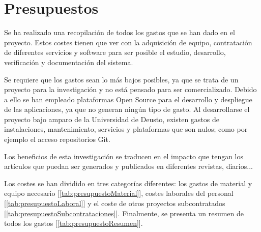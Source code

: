 \chapter{Presupuestos}
Se ha realizado una recopilación de todos los gastos que se han dado en el proyecto. Estos costes
tienen que ver con la adquisición de equipo, contratación de diferentes servicios y software para
ser posible el estudio, desarrollo, verificación y documentación del sistema.

Se requiere que los gastos sean lo más bajos posibles, ya que se trata de un proyecto para la
investigación y no está pensado para ser comercializado. Debido a ello se han empleado plataformas
Open Source para el desarrollo y despliegue de las aplicaciones, ya que no generan ningún tipo de
gasto. Al desarrollarse el proyecto bajo amparo de la Universidad de Deusto, existen gastos de
instalaciones, mantenimiento, servicios y plataformas que son nulos; como por ejemplo el acceso
repositorios Git.

Los beneficios de esta investigación se traducen en el impacto que tengan los artículos que puedan ser
generados y publicados en diferentes revistas, diarios...

Los costes se han dividido en tres categorías diferentes: los gastos de material y equipo necesario
[\ref{tab:presupuestoMaterial}], costes laborales del personal [\ref{tab:presupuestoLaboral}] y el
coste de otros proyectos subcontratados [\ref{tab:presupuestoSubcontrataciones}]. Finalmente, se
presenta un resumen de todos los gastos [\ref{tab:presupuestoResumen}].

